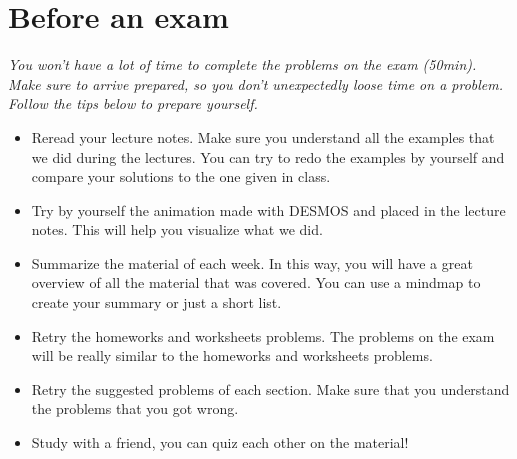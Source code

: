 \documentclass[12pt]{amsart}
\begin{document}
\section*{Before an exam}
\textit{You won't have a lot of time to complete the problems on the exam (50min). Make sure to arrive prepared, so you don't unexpectedly loose time on a problem. Follow the tips below to prepare yourself.}
	\begin{itemize}
	\item Reread your lecture notes. Make sure you understand all the examples that we did during the lectures. You can try to redo the examples by yourself and compare your solutions to the one given in class. 
	\item Try by yourself the animation made with DESMOS and placed in the lecture notes. This will help you visualize what we did.
	\item Summarize the material of each week. In this way, you will have a great overview of all the material that was covered. You can use a mindmap to create your summary or just a short list.
	\item Retry the homeworks and worksheets problems. The problems on the exam will be really similar to the homeworks and worksheets problems.
	\item Retry the suggested problems of each section. Make sure that you understand the problems that you got wrong. 
	\item Study with a friend, you can quiz each other on the material!
	\end{itemize}
\end{document}
